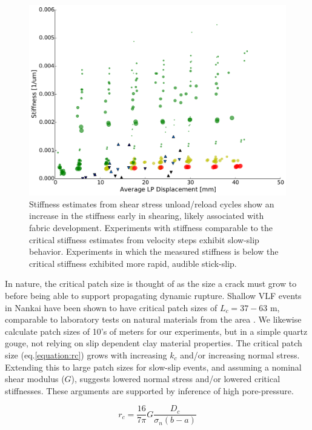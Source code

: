 \documentclass[11pt]{article}
\begin{document}
\begin{figure}
    \centering
        \includegraphics[scale=0.4]{../Figures/Fig_Stiffness_Evolution/Stiffness_Evolution.pdf}
       \caption{Stiffness estimates from shear stress unload/reload cycles show
       an increase in the stiffness early in shearing, likely associated with
       fabric development. Experiments with stiffness comparable to the critical stiffness
       estimates from velocity steps exhibit slow-slip behavior. Experiments in
       which the measured stiffness is below the critical stiffness exhibited
       more rapid, audible stick-slip.}
      \label{Figure:Stiffness Evolution}
\end{figure}

In nature, the critical patch size is thought of as the size a crack must grow
to before being able to support propagating dynamic rupture. Shallow VLF events in
Nankai have been shown to have critical patch sizes of $L_c = 37-63$ m,
comparable to laboratory tests on natural materials from the area
\cite{Ikari:2013}. We likewise calculate  patch sizes of 10's of meters for our
experiments, but in a simple quartz gouge,  not relying on slip dependent clay
material properties. The critical patch size (eq.\ref{equation:rc}) grows with
increasing $k_c$ and/or increasing normal stress. Extending this to large patch
sizes for slow-slip events, and assuming a nominal shear modulus ($G$), suggests
lowered normal stress and/or lowered critical stiffnesses. These arguments are
supported by inference of high pore-pressure.

\begin{equation}
    r_c = \frac{16}{7\pi}G \frac{D_c}{\sigma_n (b-a)}
    \label{equation:rc}
\end{equation}
\end{document}

